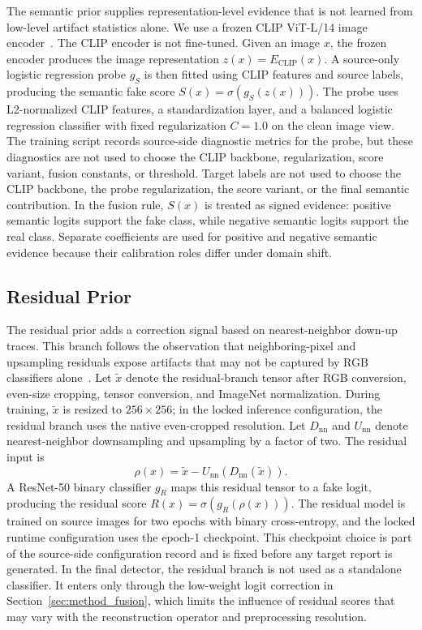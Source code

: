 \documentclass[lettersize,journal]{IEEEtran}
\begin{document}
The semantic prior supplies representation-level evidence that is not learned from low-level artifact statistics alone. We use a frozen CLIP ViT-L/14 image encoder~\cite{radford2021clip}. The CLIP encoder is not fine-tuned. Given an image $x$, the frozen encoder produces the image representation $z(x)=E_{\mathrm{CLIP}}(x)$. A source-only logistic regression probe $g_S$ is then fitted using CLIP features and source labels, producing the semantic fake score $S(x)=\sigma(g_S(z(x)))$. The probe uses L2-normalized CLIP features, a standardization layer, and a balanced logistic regression classifier with fixed regularization $C=1.0$ on the clean image view. The training script records source-side diagnostic metrics for the probe, but these diagnostics are not used to choose the CLIP backbone, regularization, score variant, fusion constants, or threshold. Target labels are not used to choose the CLIP backbone, the probe regularization, the score variant, or the final semantic contribution. In the fusion rule, $S(x)$ is treated as signed evidence: positive semantic logits support the fake class, while negative semantic logits support the real class. Separate coefficients are used for positive and negative semantic evidence because their calibration roles differ under domain shift.

\subsection{Residual Prior}
\label{sec:method_residual}

The residual prior adds a correction signal based on nearest-neighbor down-up traces. This branch follows the observation that neighboring-pixel and upsampling residuals expose artifacts that may not be captured by RGB classifiers alone~\cite{tan2024npr}. Let $\tilde{x}$ denote the residual-branch tensor after RGB conversion, even-size cropping, tensor conversion, and ImageNet normalization. During training, $\tilde{x}$ is resized to $256 \times 256$; in the locked inference configuration, the residual branch uses the native even-cropped resolution. Let $D_{\mathrm{nn}}$ and $U_{\mathrm{nn}}$ denote nearest-neighbor downsampling and upsampling by a factor of two. The residual input is
\[
    \rho(x)=\tilde{x}-U_{\mathrm{nn}}(D_{\mathrm{nn}}(\tilde{x})).
\]
A ResNet-50 binary classifier $g_R$ maps this residual tensor to a fake logit, producing the residual score $R(x)=\sigma(g_R(\rho(x)))$. The residual model is trained on source images for two epochs with binary cross-entropy, and the locked runtime configuration uses the epoch-1 checkpoint. This checkpoint choice is part of the source-side configuration record and is fixed before any target report is generated. In the final detector, the residual branch is not used as a standalone classifier. It enters only through the low-weight logit correction in Section~\ref{sec:method_fusion}, which limits the influence of residual scores that may vary with the reconstruction operator and preprocessing resolution.
\end{document}
